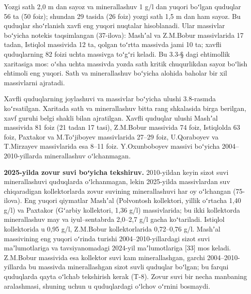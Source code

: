 Yozgi sath 2,0 m dan sayoz va minerallashuv 1 g/l dan yuqori boʻlgan
quduqlar 56 ta (50 foiz); shundan 29 tasida (26 foiz) yozgi sath 1,5 m
dan ham sayoz. Bu quduqlar shoʻrlanish xavfi eng yuqori nuqtalar
hisoblanadi. Ular massivlar boʻyicha notekis taqsimlangan (37-ilova):
Mashʼal va Z.M.Bobur massivlarida 17 tadan, Istiqlol massivida 12 ta,
qolgan toʻrtta massivda jami 10 ta; xavfli quduqlarning 82 foizi uchta
massivga toʻgʻri keladi. Bu 3.3-§ dagi ehtimollik xaritasiga mos: oʻsha
uchta massivda yozda sath kritik chuqurlikdan sayoz boʻlish ehtimoli eng
yuqori. Sath va minerallashuv boʻyicha alohida baholar bir xil
massivlarni ajratadi.

Xavfli quduqlarning joylashuvi va massivlar boʻyicha ulushi 3.8-rasmda
koʻrsatilgan. Xaritada sath va minerallashuv bitta rang shkalasida birga
berilgan, xavf guruhi belgi shakli bilan ajratilgan. Xavfli quduqlar
ulushi Mashʼal massivida 81 foiz (21 tadan 17 tasi), Z.M.Bobur massivida
74 foiz, Istiqlolda 63 foiz, Paxtakor va M.Toʻjiboyev massivlarida
27--29 foiz, U.Qoraboyev va T.Mirzayev massivlarida esa 8--11 foiz.
Y.Oxunboboyev massivi boʻyicha 2004--2010-yillarda minerallashuv
oʻlchanmagan.



\textbf{2025-yilda zovur suvi boʻyicha tekshiruv.} 2010-yildan keyin
sizot suvi minerallashuvi quduqlarda oʻlchanmagan, lekin 2025-yilda
massivlardan suv chiqaradigan kollektorlarda zovur suvining
minerallashuvi har oy oʻlchangan (75-ilova). Eng yuqori qiymatlar
Mashʼal (Polvontosh kollektori, yillik oʻrtacha 1,40 g/l) va Paxtakor
(Gʻarbiy kollektori, 1,36 g/l) massivlarida; bu ikki kollektorda
minerallashuv may va iyul--sentabrda 2,0--2,7 g/l gacha koʻtariladi.
Istiqlol kollektorida u 0,95 g/l, Z.M.Bobur kollektorlarida 0,72--0,76
g/l. Mashʼal massivining eng yuqori oʻrinda turishi
2004--2010-yillardagi sizot suvi maʼlumotlariga va tavsiyanomadagi
2024-yil maʼlumotlariga {[}33{]} mos keladi. Z.M.Bobur massivida esa
kollektor suvi kam minerallashgan, garchi 2004--2010-yillarda bu
massivda minerallashgan sizot suvli quduqlar boʻlgan; bu farqni
quduqlarda qayta oʻlchab tekshirish kerak (T-8). Zovur suvi bir necha
manbaning aralashmasi, shuning uchun u quduqlardagi oʻlchov oʻrnini
bosmaydi.

